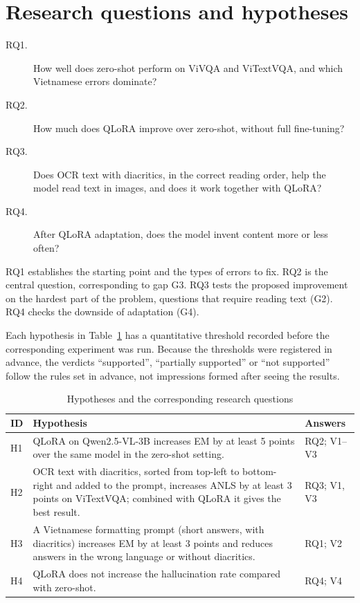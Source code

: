 \section{Research questions and hypotheses}
\label{sec:intro-rq}

\begin{description}
  \item[RQ1.] How well does zero-shot perform on ViVQA and ViTextVQA, and which
  Vietnamese errors dominate?
  \item[RQ2.] How much does QLoRA improve over zero-shot, without full fine-tuning?
  \item[RQ3.] Does OCR text with diacritics, in the correct reading order, help the
  model read text in images, and does it work together with QLoRA?
  \item[RQ4.] After QLoRA adaptation, does the model invent content more or less
  often?
\end{description}

RQ1 establishes the starting point and the types of errors to fix. RQ2 is the
central question, corresponding to gap G3. RQ3 tests the proposed improvement on the
hardest part of the problem, questions that require reading text (G2). RQ4 checks
the downside of adaptation (G4).

Each hypothesis in Table~\ref{tab:hypotheses} has a quantitative threshold recorded
before the corresponding experiment was run. Because the thresholds were registered in
advance, the verdicts ``supported'', ``partially supported'' or ``not supported''
follow the rules set in advance, not impressions formed after seeing the results.

\begin{table}[htbp]
\caption{Hypotheses and the corresponding research questions}
\label{tab:hypotheses}
\centering
\small
\begin{tabular}{p{}p{}p{}}
\toprule
\textbf{ID} & \textbf{Hypothesis} & \textbf{Answers} \\
\midrule
H1 & QLoRA on Qwen2.5-VL-3B increases EM by at least 5 points over the same model in
the zero-shot setting. & RQ2; V1--V3 \\
H2 & OCR text with diacritics, sorted from top-left to bottom-right and added to the
prompt, increases ANLS by at least 3 points on ViTextVQA; combined with QLoRA it gives
the best result. & RQ3; V1, V3 \\
H3 & A Vietnamese formatting prompt (short answers, with diacritics) increases EM by
at least 3 points and reduces answers in the wrong language or without diacritics. &
RQ1; V2 \\
H4 & QLoRA does not increase the hallucination rate compared with zero-shot. & RQ4;
V4 \\
\bottomrule
\end{tabular}
\end{table}

